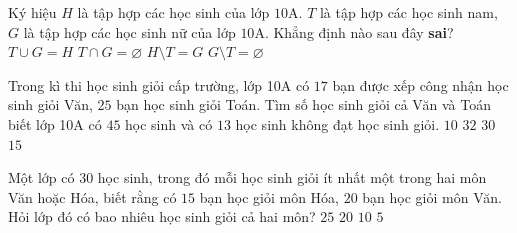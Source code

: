 

\begin{ex}%
	Ký hiệu $H$ là tập hợp các học sinh của lớp $10 \mathrm{A}$. $T$ là tập hợp các học  sinh nam, $G$ là tập hợp các học sinh nữ của lớp $10 \mathrm{A}$. Khẳng định nào sau đây \textbf{sai}?
	\choice 
		{$T  \cup G=H$}
		 {$T \cap G=\varnothing$}
		 {$H \setminus T=G$}
		{\True $G \setminus  T=\varnothing$}
\end{ex}

\begin{ex}%
	Trong kì thi học sinh giỏi cấp trường, lớp 10A có $17$ bạn được  xếp công nhận học sinh giỏi Văn, $25$ bạn học sinh giỏi Toán. Tìm số học sinh giỏi cả Văn và Toán biết lớp 10A có $45$ học sinh và có $13$ học sinh không đạt học sinh giỏi.
	 \choice
		{\True $10$} 
		{$32$} 
		{$30$} 
		 {$15$}
\end{ex}

\begin{ex}%
	Một lớp có $30$ học sinh, trong đó mỗi học sinh giỏi ít nhất một trong  hai môn Văn hoặc Hóa, biết rằng có $15$ bạn học giỏi môn Hóa, $20$ bạn học giỏi môn Văn. Hỏi lớp đó có bao nhiêu học sinh giỏi cả hai môn?
	\choice 
		 {$25$}
		 {$20$}
		{$10$} 
		 {\True $5$}
\end{ex}

